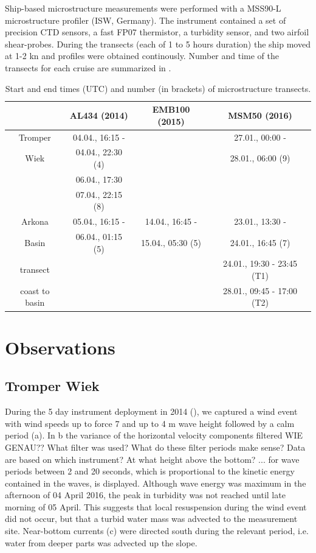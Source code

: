 Ship-based microstructure measurements were performed with a MSS90-L 
microstructure profiler (ISW, Germany). The instrument contained a set of 
precision CTD sensors, a fast FP07 thermistor, a turbidity sensor, and two 
airfoil shear-probes. During the transects (each of 1 to 5 hours duration) the 
ship moved at 1-2 kn and profiles were obtained continously. Number and time of 
the transects for each cruise are summarized in .

 \begin{table}
\caption{Start and end times (UTC) and number (in brackets) of microstructure 
transects.}\label{mss}
\begin{center}
\begin{tabular}{cccc}
 & AL434 (2014) & EMB100 (2015) & MSM50 (2016)\\
 \hline
Tromper & 04.04., 16:15 - & & 27.01., 00:00 - \\ 
Wiek & 04.04., 22:30 (4) & & 28.01., 06:00 (9)\\
 & 06.04., 17:30 & & \\
 &  07.04., 22:15 (8) & & \\
\hline
Arkona & 05.04., 16:15 - & 14.04., 16:45 - & 23.01., 13:30 - \\
Basin & 06.04., 01:15 (5) & 15.04., 05:30 (5) & 24.01., 16:45 (7)\\
\hline
transect &  & & 24.01., 19:30 - 23:45 (T1)\\
coast to basin & & & 28.01., 09:45 - 17:00 (T2)\\
\end{tabular}
\end{center}
\end{table}

\section{Observations}

\subsection{Tromper Wiek}

During the 5 day instrument deployment in 2014 (), we captured 
a wind event with wind speeds up to force 7 and up to 4 m wave height followed 
by a calm 
period (a). In b the variance of the 
horizontal velocity components filtered WIE GENAU?? What filter was used? What 
do these filter periods make sense? Data are based on which instrument? At what 
height above the bottom? ... for wave periods between 2 and 20 
seconds, which is proportional to the kinetic energy contained in the 
waves, is displayed. Although wave energy was maximum in the afternoon of 
04 April 2016, the peak in turbidity was not reached until late morning of 
05 April. This 
suggests that local resuspension during the wind event did not occur, but that 
a turbid 
water mass was advected to the measurement site. Near-bottom currents 
(c) were directed south during the relevant period, 
i.e. water from deeper parts was advected up the slope.

